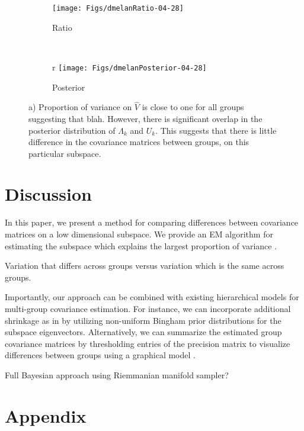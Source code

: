 \documentclass{article}
\begin{document}
\begin{figure}[t]
    \centering
    \begin{subfigure}[b]{0.45\textwidth}
        \texttt{[image: Figs/dmelanRatio-04-28]}
        \caption{Ratio}
        \label{fig:dmelanRatio}
    \end{subfigure}
    ~ %
    \begin{subfigure}[b]{0.45\textwidth}r
        \texttt{[image: Figs/dmelanPosterior-04-28]}
        \caption{Posterior}
        \label{fig:dmelanPosterior}
    \end{subfigure}
    \caption{a) Proportion of variance on $\hat{V}$ is close to one
      for all groups suggesting that blah. However, there is
      significant overlap in the posterior distribution of $\Lambda_k$
      and $U_k$. This suggests that there is little difference in the
      covariance matrices between groups, on this particular subspace.  }
\end{figure}

\section{Discussion}

In this paper, we present a method for comparing differences between
covariance matrices on a low dimensional subspace.  We provide an EM
algorithm for estimating the subspace which explains the largest
proportion of variance .

Variation that differs across groups versus variation which is the
same across groups.

Importantly, our approach can be combined with existing hierarchical
models for multi-group covariance estimation.  For instance, we can
incorporate additional shrinkage as in \citet{Hoff2009} by utilizing
non-uniform Bingham prior distributions for the subspace eigenvectors.
Alternatively, we can summarize the estimated group covariance
matrices by thresholding entries of the precision matrix to visualize
differences between groups using a graphical model \citep{}.

Full Bayesian approach using Riemmanian manifold sampler?




\section{Appendix}
\end{document}
